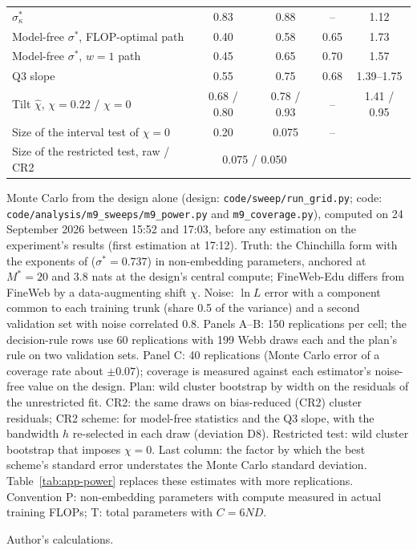 \begin{table}[tp]
\begin{tabular*}{\textwidth}{@{\extracolsep{\fill}}>{\raggedright\arraybackslash}p{}cccc@{}}
\cmidrule(lr){2-5}
$\sigma^*_\kappa$ & 0.83 & 0.88 & -- & 1.12 \\
Model-free $\sigma^*$, FLOP-optimal path & 0.40 & 0.58 & 0.65 & 1.73 \\
Model-free $\sigma^*$, $w=1$ path & 0.45 & 0.65 & 0.70 & 1.57 \\
Q3 slope & 0.55 & 0.75 & 0.68 & 1.39--1.75 \\
Tilt $\hat\chi$, $\chi=0.22$ / $\chi=0$ & 0.68 / 0.80 & 0.78 / 0.93 & -- & 1.41 / 0.95 \\
Size of the interval test of $\chi=0$ & 0.20 & 0.075 & -- & \\
Size of the restricted test, raw / CR2 & \multicolumn{2}{c}{0.075 / 0.050} & & \\
\bottomrule
\end{tabular*}

\begin{tablenotes}
Monte Carlo from the design alone (design: \texttt{code/sweep/run\_grid.py}; code:
\texttt{code/analysis/m9\_sweeps/m9\_power.py} and \texttt{m9\_coverage.py}), computed on 24 September 2026 between 15:52
and 17:03, before any estimation on the experiment's results (first estimation at 17:12). Truth: the Chinchilla form with
the exponents of \citet{besiroglu2024chinchilla} ($\sigma^*=0.737$) in non-embedding parameters, anchored at $M^*=20$ and
3.8 nats at the design's central compute; FineWeb-Edu differs from FineWeb by a data-augmenting shift $\chi$. Noise: $\ln
L$ error with a component common to each training trunk (share 0.5 of the variance) and a second validation set with
noise correlated 0.8. Panels A--B: 150 replications per cell; the decision-rule rows use 60 replications with 199 Webb
draws each and the plan's rule on two validation sets. Panel C: 40 replications (Monte Carlo error of a coverage rate
about $\pm0.07$); coverage is measured against each estimator's noise-free value on the design. Plan: wild cluster
bootstrap by width on the residuals of the unrestricted fit. CR2: the same draws on bias-reduced (CR2) cluster
residuals; CR2 scheme: for model-free statistics and the Q3 slope, with the bandwidth $h$ re-selected in each draw
(deviation D8). Restricted test: wild cluster bootstrap that imposes $\chi=0$. Last column: the factor by which the best
scheme's standard error understates the Monte Carlo standard deviation. Table~\ref{tab:app-power} replaces these
estimates with more replications. Convention P: non-embedding parameters with compute measured in actual training FLOPs;
T: total parameters with $C=6ND$.
\end{tablenotes}
\begin{tablenotes}[Source]
Author's calculations.
\end{tablenotes}
\end{table}

